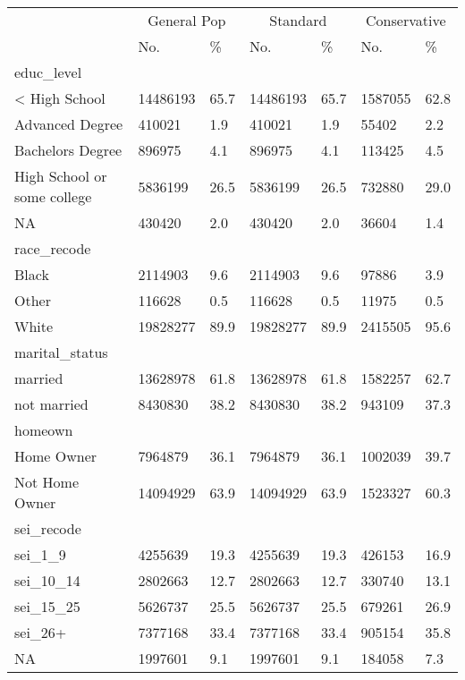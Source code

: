 \captionsetup[table]{labelformat=empty,skip=1pt}
\begin{longtable}{lllllll}
\toprule
& \multicolumn{2}{c}{General Pop} & \multicolumn{2}{c}{Standard} & \multicolumn{2}{c}{Conservative} \\ 
 \cmidrule(lr){2-3}\cmidrule(lr){4-5}\cmidrule(lr){6-7}
 & No. & \% & No. & \% & No. & \% \\ 
\midrule
\multicolumn{1}{l}{educ\_level} \\ 
\midrule
< High School & 14486193 & 65.7 & 14486193 & 65.7 & 1587055 & 62.8 \\ 
Advanced Degree & 410021 & 1.9 & 410021 & 1.9 & 55402 & 2.2 \\ 
Bachelors Degree & 896975 & 4.1 & 896975 & 4.1 & 113425 & 4.5 \\ 
High School or some college & 5836199 & 26.5 & 5836199 & 26.5 & 732880 & 29.0 \\ 
NA & 430420 & 2.0 & 430420 & 2.0 & 36604 & 1.4 \\ 
\midrule
\multicolumn{1}{l}{race\_recode} \\ 
\midrule
Black & 2114903 & 9.6 & 2114903 & 9.6 & 97886 & 3.9 \\ 
Other & 116628 & 0.5 & 116628 & 0.5 & 11975 & 0.5 \\ 
White & 19828277 & 89.9 & 19828277 & 89.9 & 2415505 & 95.6 \\ 
\midrule
\multicolumn{1}{l}{marital\_status} \\ 
\midrule
married & 13628978 & 61.8 & 13628978 & 61.8 & 1582257 & 62.7 \\ 
not married & 8430830 & 38.2 & 8430830 & 38.2 & 943109 & 37.3 \\ 
\midrule
\multicolumn{1}{l}{homeown} \\ 
\midrule
Home Owner & 7964879 & 36.1 & 7964879 & 36.1 & 1002039 & 39.7 \\ 
Not Home Owner & 14094929 & 63.9 & 14094929 & 63.9 & 1523327 & 60.3 \\ 
\midrule
\multicolumn{1}{l}{sei\_recode} \\ 
\midrule
sei\_1\_9 & 4255639 & 19.3 & 4255639 & 19.3 & 426153 & 16.9 \\ 
sei\_10\_14 & 2802663 & 12.7 & 2802663 & 12.7 & 330740 & 13.1 \\ 
sei\_15\_25 & 5626737 & 25.5 & 5626737 & 25.5 & 679261 & 26.9 \\ 
sei\_26+ & 7377168 & 33.4 & 7377168 & 33.4 & 905154 & 35.8 \\ 
NA & 1997601 & 9.1 & 1997601 & 9.1 & 184058 & 7.3 \\ 

\end{longtable}
